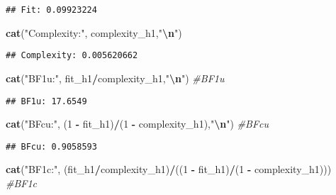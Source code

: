 \documentclass[
]{article}
\newenvironment{Shaded}{\begin{snugshade}}{\end{snugshade}}
\newcommand{\CommentTok}[1]{\textcolor[rgb]{0.56,0.35,0.01}{\textit{#1}}}
\newcommand{\DecValTok}[1]{\textcolor[rgb]{0.00,0.00,0.81}{#1}}
\newcommand{\FunctionTok}[1]{\textcolor[rgb]{0.13,0.29,0.53}{\textbf{#1}}}
\newcommand{\NormalTok}[1]{#1}
\newcommand{\SpecialCharTok}[1]{\textcolor[rgb]{0.81,0.36,0.00}{\textbf{#1}}}
\newcommand{\StringTok}[1]{\textcolor[rgb]{0.31,0.60,0.02}{#1}}
\begin{document}
\begin{verbatim}
## Fit: 0.09923224
\end{verbatim}

\begin{Shaded}
\begin{Highlighting}[]
\FunctionTok{cat}\NormalTok{(}\StringTok{"Complexity:"}\NormalTok{, complexity\_h1,}\StringTok{"}\SpecialCharTok{\textbackslash{}n}\StringTok{"}\NormalTok{)}
\end{Highlighting}
\end{Shaded}

\begin{verbatim}
## Complexity: 0.005620662
\end{verbatim}

\begin{Shaded}
\begin{Highlighting}[]
\FunctionTok{cat}\NormalTok{(}\StringTok{"BF1u:"}\NormalTok{, fit\_h1}\SpecialCharTok{/}\NormalTok{complexity\_h1,}\StringTok{"}\SpecialCharTok{\textbackslash{}n}\StringTok{"}\NormalTok{)                                     }\CommentTok{\#BF1u}
\end{Highlighting}
\end{Shaded}

\begin{verbatim}
## BF1u: 17.6549
\end{verbatim}

\begin{Shaded}
\begin{Highlighting}[]
\FunctionTok{cat}\NormalTok{(}\StringTok{"BFcu:"}\NormalTok{, (}\DecValTok{1} \SpecialCharTok{{-}}\NormalTok{ fit\_h1)}\SpecialCharTok{/}\NormalTok{(}\DecValTok{1} \SpecialCharTok{{-}}\NormalTok{ complexity\_h1),}\StringTok{"}\SpecialCharTok{\textbackslash{}n}\StringTok{"}\NormalTok{)                              }\CommentTok{\#BFcu}
\end{Highlighting}
\end{Shaded}

\begin{verbatim}
## BFcu: 0.9058593
\end{verbatim}

\begin{Shaded}
\begin{Highlighting}[]
\FunctionTok{cat}\NormalTok{(}\StringTok{"BF1c:"}\NormalTok{, (fit\_h1}\SpecialCharTok{/}\NormalTok{complexity\_h1)}\SpecialCharTok{/}\NormalTok{((}\DecValTok{1} \SpecialCharTok{{-}}\NormalTok{ fit\_h1)}\SpecialCharTok{/}\NormalTok{(}\DecValTok{1} \SpecialCharTok{{-}}\NormalTok{ complexity\_h1)))     }\CommentTok{\#BF1c}
\end{Highlighting}
\end{Shaded}
\end{document}

